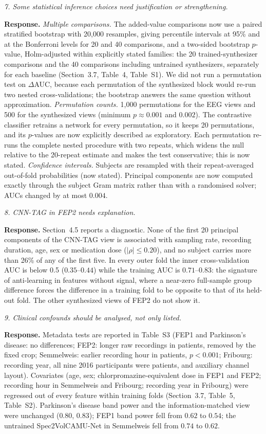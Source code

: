 \documentclass[11pt]{article}
\newcommand{\rc}[1]{\par\medskip\noindent\textit{#1}\par\smallskip}
\newcommand{\resp}{\noindent\textbf{Response.} }
\begin{document}
\rc{7. Some statistical inference choices need justification or strengthening.}
\resp \textit{Multiple comparisons.} The added-value comparisons now use a paired stratified bootstrap with 20,000 resamples, giving percentile intervals at 95\% and at the Bonferroni levels for 20 and 40 comparisons, and a two-sided bootstrap $p$-value, Holm-adjusted within explicitly stated families: the 20 trained-synthesizer comparisons and the 40 comparisons including untrained synthesizers, separately for each baseline (Section~3.7, Table~4, Table~S1). We did not run a permutation test on $\Delta$AUC, because each permutation of the synthesized block would re-run two nested cross-validations; the bootstrap answers the same question without approximation. \textit{Permutation counts.} 1,000 permutations for the EEG views and 500 for the synthesized views (minimum $p\approx0.001$ and $0.002$). The contrastive classifier retrains a network for every permutation, so it keeps 20 permutations, and its $p$-values are now explicitly described as exploratory. Each permutation re-runs the complete nested procedure with two repeats, which widens the null relative to the 20-repeat estimate and makes the test conservative; this is now stated. \textit{Confidence intervals.} Subjects are resampled with their repeat-averaged out-of-fold probabilities (now stated). Principal components are now computed exactly through the subject Gram matrix rather than with a randomised solver; AUCs changed by at most $0.004$.

\rc{8. CNN-TAG in FEP2 needs explanation.}
\resp Section~4.5 reports a diagnostic. None of the first 20 principal components of the CNN-TAG view is associated with sampling rate, recording duration, age, sex or medication dose ($|\rho|\leq0.20$), and no subject carries more than 26\% of any of the first five. In every outer fold the inner cross-validation AUC is below 0.5 ($0.35$--$0.44$) while the training AUC is $0.71$--$0.83$: the signature of anti-learning in features without signal, where a near-zero full-sample group difference forces the difference in a training fold to be opposite to that of its held-out fold. The other synthesized views of FEP2 do not show it.

\rc{9. Clinical confounds should be analysed, not only listed.}
\resp Metadata tests are reported in Table~S3 (FEP1 and Parkinson's disease: no differences; FEP2: longer raw recordings in patients, removed by the fixed crop; Semmelweis: earlier recording hour in patients, $p<0.001$; Fribourg: recording year, all nine 2016 participants were patients, and auxiliary channel layout). Covariates (age, sex; chlorpromazine-equivalent dose in FEP1 and FEP2; recording hour in Semmelweis and Fribourg; recording year in Fribourg) were regressed out of every feature within training folds (Section~3.7, Table~5, Table~S2). Parkinson's disease band power and the information-matched view were unchanged ($0.80$, $0.83$); FEP1 band power fell from $0.62$ to $0.54$; the untrained Spec2VolCAMU-Net in Semmelweis fell from $0.74$ to $0.62$.
\end{document}
